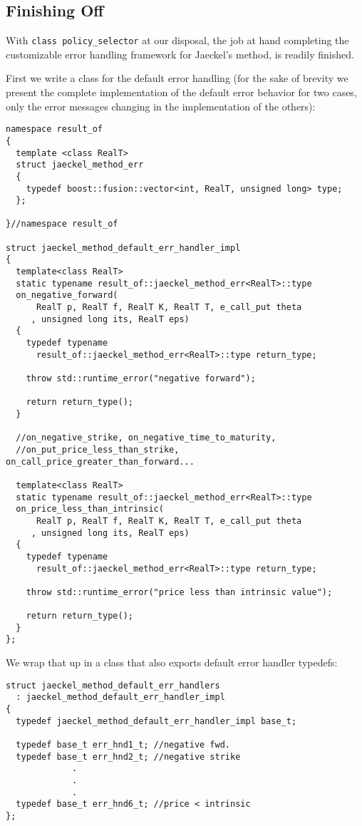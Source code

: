 \documentclass[a4paper,twoside,twocolumn]{article}
\begin{document}
\subsection{Finishing Off}
With \verb|class policy_selector| at our disposal, the job at hand
completing the customizable error handling framework for Jaeckel's
method, is readily finished. 

First we write a class for the default error handling (for the sake of
brevity we present the complete implementation of the default error
behavior for two cases, only the error messages changing in the
implementation of the others):
\begin{verbatim}
namespace result_of
{
  template <class RealT>
  struct jaeckel_method_err
  {
    typedef boost::fusion::vector<int, RealT, unsigned long> type;
  };

}//namespace result_of

struct jaeckel_method_default_err_handler_impl
{
  template<class RealT>
  static typename result_of::jaeckel_method_err<RealT>::type
  on_negative_forward(
      RealT p, RealT f, RealT K, RealT T, e_call_put theta
     , unsigned long its, RealT eps)
  {
    typedef typename
      result_of::jaeckel_method_err<RealT>::type return_type;

    throw std::runtime_error("negative forward");

    return return_type();
  }
  
  //on_negative_strike, on_negative_time_to_maturity, 
  //on_put_price_less_than_strike, on_call_price_greater_than_forward...

  template<class RealT>
  static typename result_of::jaeckel_method_err<RealT>::type
  on_price_less_than_intrinsic(
      RealT p, RealT f, RealT K, RealT T, e_call_put theta
     , unsigned long its, RealT eps)
  {
    typedef typename
      result_of::jaeckel_method_err<RealT>::type return_type;

    throw std::runtime_error("price less than intrinsic value");

    return return_type();
  }
};
\end{verbatim}
We wrap that up in a class that also exports default error handler typedefs:
\begin{verbatim}
struct jaeckel_method_default_err_handlers
  : jaeckel_method_default_err_handler_impl
{
  typedef jaeckel_method_default_err_handler_impl base_t;

  typedef base_t err_hnd1_t; //negative fwd.
  typedef base_t err_hnd2_t; //negative strike
             .
             .
             .
  typedef base_t err_hnd6_t; //price < intrinsic
};
\end{verbatim}
\end{document}

